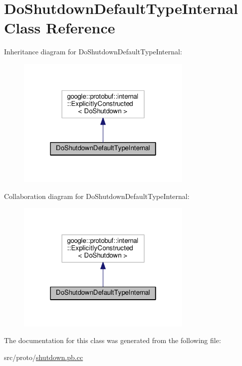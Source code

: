 \hypertarget{class_do_shutdown_default_type_internal}{}\section{Do\+Shutdown\+Default\+Type\+Internal Class Reference}
\label{class_do_shutdown_default_type_internal}


Inheritance diagram for Do\+Shutdown\+Default\+Type\+Internal\+:\nopagebreak
\begin{figure}[H]
\begin{center}
\leavevmode
\includegraphics[width=238pt]{class_do_shutdown_default_type_internal__inherit__graph}
\end{center}
\end{figure}


Collaboration diagram for Do\+Shutdown\+Default\+Type\+Internal\+:\nopagebreak
\begin{figure}[H]
\begin{center}
\leavevmode
\includegraphics[width=238pt]{class_do_shutdown_default_type_internal__coll__graph}
\end{center}
\end{figure}


The documentation for this class was generated from the following file\+:\begin{DoxyCompactItemize}
\item 
src/proto/\hyperlink{shutdown_8pb_8cc}{shutdown.\+pb.\+cc}\end{DoxyCompactItemize}
